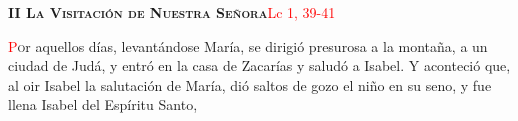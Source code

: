 \noindent\textbf{\textsc{II La Visitación de Nuestra Señora}}\hfill\textcolor{red}{Lc 1, 39-41}

\vspace{0.25em}

\lettrine[lines=2]{\textcolor{red}{P}}or aquellos días, levantándose María, se dirigió presurosa a la montaña, a un ciudad de Judá, 
y entró en la casa de Zacarías y saludó a Isabel. Y aconteció que, al oir Isabel la salutación de María, dió saltos de 
gozo el niño en su seno, y fue llena Isabel del Espíritu Santo,